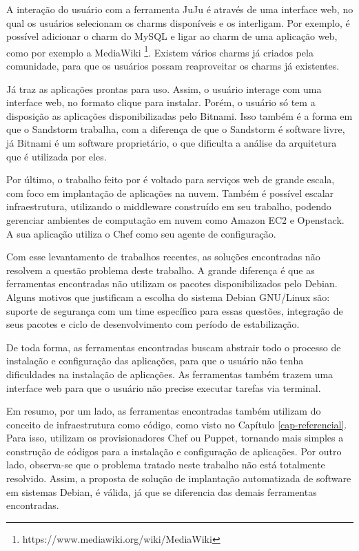 A interação do usuário com a ferramenta JuJu é através de uma interface web, 
no qual os usuários selecionam os charms disponíveis e os interligam. 
Por exemplo, é possível adicionar o charm do MySQL e ligar ao charm de uma aplicação
web, como por exemplo a MediaWiki \footnote{https://www.mediawiki.org/wiki/MediaWiki}. Existem
vários charms já criados pela comunidade, para que os usuários possam reaproveitar
os charms já existentes.
 
Já  traz as aplicações prontas para uso. Assim, o usuário interage com 
uma interface web, no formato clique para instalar. Porém,
o usuário só tem a disposição as aplicações disponibilizadas pelo Bitnami. Isso
também é a forma em que o Sandstorm trabalha, com a diferença de que o Sandstorm é
software livre, já Bitnami é um software proprietário, o que dificulta a análise da arquitetura
que é utilizada por eles. 

Por último, o trabalho feito por  é voltado
para serviços web de grande escala, com foco em implantação de aplicações na
nuvem. Também é possível escalar infraestrutura, utilizando o middleware construído 
em seu trabalho, podendo gerenciar ambientes de computação em nuvem como Amazon EC2 e 
Openstack. A sua aplicação utiliza o Chef como seu agente de configuração.

Com esse levantamento de trabalhos recentes, as soluções encontradas não resolvem 
a questão problema deste trabalho. A grande diferença é que as ferramentas 
encontradas não utilizam os pacotes disponibilizados pelo Debian. Alguns motivos
que justificam a escolha do sistema Debian GNU/Linux são: suporte de segurança
com um time específico para essas questões, integração de seus pacotes e ciclo de desenvolvimento 
com período de estabilização. 

De toda forma, as ferramentas encontradas buscam
abstrair todo o processo de instalação e configuração das aplicações, para que o
usuário não tenha dificuldades na instalação de aplicações. As ferramentas também
trazem uma interface web para que o usuário não precise executar tarefas via terminal.

Em resumo, por um lado, as ferramentas encontradas também utilizam do conceito de
infraestrutura como código, como visto no Capítulo \ref{cap-referencial}. Para
isso, utilizam os provisionadores Chef ou Puppet, tornando mais simples a
construção de códigos para a instalação e configuração de aplicações. Por outro lado, 
observa-se que o problema tratado neste trabalho não está totalmente resolvido. Assim, 
a proposta de solução de implantação automatizada de software em sistemas Debian, é válida, 
já que se diferencia das demais ferramentas encontradas.

